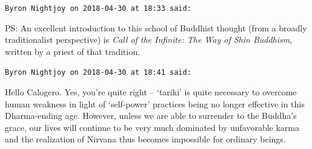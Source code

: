 \begin{footnotesize}
\begin{sffamily}
\texttt{Byron Nightjoy on 2018-04-30 at 18:33 said:}

PS: An excellent introduction to this school of Buddhist thought (from a broadly traditionalist perspective) is \textit{Call of the Infinite: The Way of Shin Buddhism}, written by a priest of that tradition.

\hfill

\texttt{Byron Nightjoy on 2018-04-30 at 18:41 said:}

Hello Calogero. Yes, you're quite right -- `tariki' is quite necessary to overcome human weakness in light of `self-power' practices being no longer effective in this Dharma-ending age. However, unless we are able to surrender to the Buddha's grace, our lives will continue to be very much dominated by unfavorable karma and the realization of Nirvana thus becomes impossible for ordinary beings.

\hfill

\end{sffamily}
\end{footnotesize}

